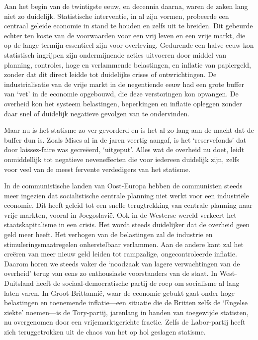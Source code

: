 \documentclass[
  a5paper,
  smalldemyvopaper,10pt,twoside,onecolumn,openright,extrafontsizes,hidelinks]{memoir}
\begin{document}
Aan het begin van de twintigste eeuw, en decennia daarna, waren de zaken
lang niet zo duidelijk. Statistische interventie, in al zijn vormen,
probeerde een centraal geleide economie in stand te houden en zelfs uit
te breiden. Dit gebeurde echter ten koste van de voorwaarden voor een
vrij leven en een vrije markt, die op de lange termijn essentieel zijn
voor overleving. Gedurende een halve eeuw kon statistisch ingrijpen zijn
ondermijnende acties uitvoeren door middel van planning, controles, hoge
en verlammende belastingen, en inflatie van papiergeld, zonder dat dit
direct leidde tot duidelijke crises of ontwrichtingen. De
industrialisatie van de vrije markt in de negentiende eeuw had een grote
buffer van `vet' in de economie opgebouwd, die deze verstoringen kon
opvangen. De overheid kon het systeem belastingen, beperkingen en
inflatie opleggen zonder daar snel of duidelijk negatieve gevolgen van
te ondervinden.

Maar nu is het statisme zo ver gevorderd en is het al zo lang aan de
macht dat de buffer dun is. Zoals Mises al in de jaren veertig aangaf,
is het `reservefonds' dat door laissez-faire was gecreëerd, `uitgeput'.
Alles wat de overheid nu doet, leidt onmiddellijk tot negatieve
neveneffecten die voor iedereen duidelijk zijn, zelfs voor veel van de
meest fervente verdedigers van het statisme.

In de communistische landen van Oost-Europa hebben de communisten steeds
meer ingezien dat socialistische centrale planning niet werkt voor een
industriële economie. Dit heeft geleid tot een snelle terugtrekking van
centrale planning naar vrije markten, vooral in Joegoslavië. Ook in de
Westerse wereld verkeert het staatskapitalisme in een crisis. Het wordt
steeds duidelijker dat de overheid geen geld meer heeft. Het verhogen
van de belastingen zal de industrie en stimuleringsmaatregelen
onherstelbaar verlammen. Aan de andere kant zal het creëren van meer
nieuw geld leiden tot rampzalige, ongecontroleerde inflatie. Daarom
horen we steeds vaker de `noodzaak van lagere verwachtingen van de
overheid' terug van eens zo enthousiaste voorstanders van de staat. In
West-Duitsland heeft de sociaal-democratische partij de roep om
socialisme al lang laten varen. In Groot-Brittannië, waar de economie
gebukt gaat onder hoge belastingen en toenemende inflatie---een situatie
die de Britten zelfs de `Engelse ziekte' noemen---is de Tory-partij,
jarenlang in handen van toegewijde statisten, nu overgenomen door een
vrijemarktgerichte fractie. Zelfs de Labor-partij heeft zich
teruggetrokken uit de chaos van het op hol geslagen statisme.
\end{document}

